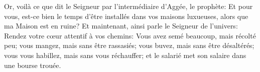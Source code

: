 Or, voilà ce que dit le Seigneur par l’intermédiaire d’Aggée, le prophète:
	Et pour vous, est-ce bien le temps d’être installés dans vos maisons luxueuses,
	alors que ma Maison est en ruine?
Et maintenant, ainsi parle le Seigneur de l’univers:
	Rendez votre cœur attentif à vos chemins:
	Vous avez semé beaucoup, mais récolté peu; vous mangez, mais sans être rassasiés;
	vous buvez, mais sans être désaltérés; vous vous habillez, mais sans vous réchauffer;
	et le salarié met son salaire dans une bourse trouée.
